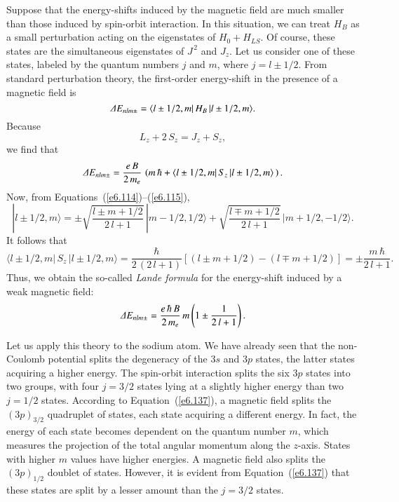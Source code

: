Suppose that the energy-shifts induced by  the magnetic field are much smaller
than those  induced by spin-orbit interaction. In this situation,
we can treat $H_B$ as a small perturbation acting on the 
eigenstates of $H_0 + H_{LS}$. 
Of course, these states are the 
simultaneous eigenstates of $J^{\,2}$ and $J_z$. Let us consider one
of these states, labeled by the quantum numbers $j$ and $m$, where $j=l\pm 1/2$.   
From  standard perturbation theory, the first-order energy-shift 
in the presence of a  magnetic field is
\begin{equation}
{\mit\Delta} E_{nlm\pm} = \langle l\pm 1/2, m|\, H_B\, | l\pm 1/2, m\rangle.
\end{equation}
Because 
\begin{equation}
L_z + 2 \,S_z = J_z + S_z,
\end{equation}
we find that
\begin{equation}
{\mit\Delta} E_{nlm\pm} = \frac{e\, B}{2 \,m_e}\, \left(m\,\hbar + \langle  
l\pm 1/2, m|\, S_z\,| l\pm 1/2, m\rangle\,
\right).
\end{equation}
Now, from Equations~(\ref{e6.114})--(\ref{e6.115}),
\begin{equation}
|l\pm 1/2, m\rangle = \pm \sqrt{\frac{l\pm m +1/2}{2\,l+1}}\,
|m-1/2, 1/2\rangle+\sqrt{\frac{l\mp m+1/2}{2\,l+1}}\, |m+1/2, -1/2\rangle.
\end{equation}
It follows that
\begin{equation}
 \langle  
l\pm 1/2, m|\, S_z\,| l\pm 1/2, m\rangle = \frac{\hbar}{2\,(2\,l+1)}
\left[(l\pm m+1/2) - (l\mp m + 1/2) \right] = \pm \frac{m\,\hbar}{2\,l+1}.
\end{equation}
Thus, we obtain the so-called {\em Lande formula}\/ for the energy-shift induced by  a
weak magnetic field:
\begin{equation}\label{e6.137}
{\mit\Delta} E_{nlm\pm} = \frac{e\, \hbar\, B}{2\, m_e}\,m \left( 1 \pm \frac{1}{2\,l+1}
\right).
\end{equation}

Let us apply this theory to the sodium atom. We have already seen that
the non-Coulomb potential splits the degeneracy of the $3s$ and $3p$ states,
the latter states acquiring  a  higher energy. The spin-orbit interaction
splits the six $3p$ states into two groups, with four $j=3/2$ states
lying at a slightly higher energy than two $j=1/2$ states. According to
Equation~(\ref{e6.137}), a magnetic field splits the $(3p)_{3/2}$ quadruplet of states,
each state acquiring a different energy. In fact, the energy of  each state
becomes  dependent  on the quantum number $m$, which measures the
projection of the total angular momentum along the $z$-axis. States with
higher $m$ values have higher energies. 
A magnetic field also splits the $(3p)_{1/2}$ doublet of states. However,
it is evident from Equation~(\ref{e6.137}) that these states are split by a lesser
amount than the $j=3/2$ states. 

